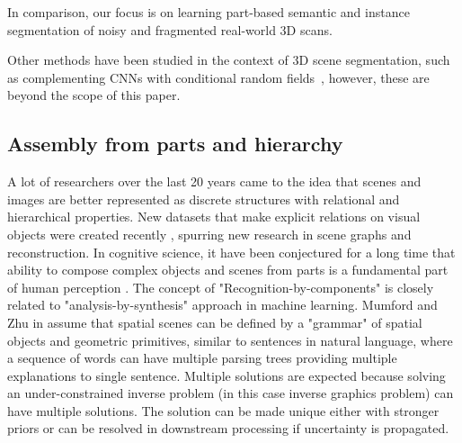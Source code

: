 In comparison, our focus is on learning part-based semantic and instance segmentation of noisy and fragmented real-world 3D scans. 

Other methods have been studied in the context of 3D scene segmentation, such as complementing CNNs with conditional random fields~\cite{pham2019jsis3d,pham2019real,wang2017cnn}, however, these are beyond the scope of this paper.


\subsection{Assembly from parts and hierarchy}
A lot of researchers over the last 20 years came to the idea that scenes and images are better represented as discrete structures with relational and hierarchical properties.
New datasets that make explicit relations on visual objects were created recently \cite{krishna2017visual}, spurring new research in scene graphs \cite{DBLP:journals/corr/abs-1804-01622,Xu_2017_CVPR} and reconstruction. 
In cognitive science, it have been conjectured for a long time that ability to compose complex objects and scenes from parts is a fundamental part of human perception \cite{hoffman1984parts,biederman1987recognition}. The concept of "Recognition-by-components" is closely related to "analysis-by-synthesis" \cite{yuille2006vision,yildirim2015efficient} approach in machine learning. 
Mumford and Zhu in \cite{zhu2006stochastic} assume that spatial scenes can be defined by a "grammar" of spatial objects and geometric primitives, similar to sentences in natural language, where a sequence of words can have multiple parsing trees providing multiple explanations to single sentence. Multiple solutions are expected because solving an under-constrained inverse problem (in this case inverse graphics problem) can have multiple solutions. The solution can be made unique either with stronger priors or can be resolved in downstream processing if uncertainty is propagated.



